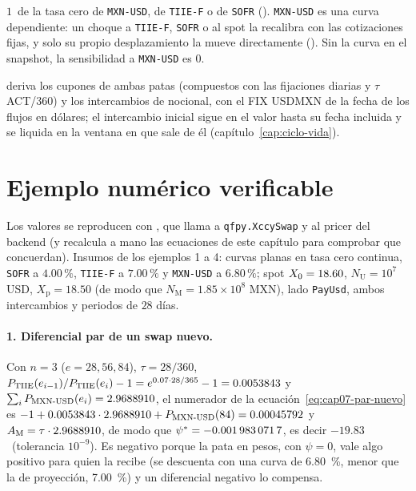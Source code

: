 \begin{description}
    $1$~\pb de la tasa cero de \texttt{MXN-USD}, de \texttt{TIIE-F} o de \texttt{SOFR}
    (). \texttt{MXN-USD} es una curva dependiente: un choque a
    \texttt{TIIE-F}, \texttt{SOFR} o al spot la recalibra con las cotizaciones fijas, y solo su propio
    desplazamiento la mueve directamente (). Sin la curva en el snapshot,
    la sensibilidad a \texttt{MXN-USD} es $0$.
  \item[Liquidaciones.]  deriva los cupones de ambas patas (compuestos con las
    fijaciones diarias y $\tau$ ACT/360) y los intercambios de nocional, con el FIX USDMXN de la fecha de los
    flujos en dólares; el intercambio inicial sigue en el valor hasta su fecha incluida y se liquida en la
    ventana en que sale de él (capítulo~\ref{cap:ciclo-vida}).
\end{description}

\section{Ejemplo numérico verificable}\label{sec:cap07-ejemplo}

Los valores se reproducen con , que llama a
\texttt{qfpy.XccySwap} y al pricer del backend (y recalcula a mano las ecuaciones de este capítulo para
comprobar que concuerdan). Insumos de los ejemplos 1 a 4: curvas planas en tasa cero continua, \texttt{SOFR} a
$4.00\,\%$, \texttt{TIIE-F} a $7.00\,\%$ y \texttt{MXN-USD} a $6.80\,\%$; spot $\Spot=18.60$,
$N_{\mathrm U}=10^{7}$ USD, $X_{\mathrm p}=18.50$ (de modo que $N_{\mathrm M}=1.85\times10^{8}$ MXN), lado
\texttt{PayUsd}, ambos intercambios y periodos de $28$ días.

\paragraph{1. Diferencial par de un swap nuevo.} Con $n=3$ ($e=28,56,84$), $\tau=28/360$,
$P_{\cTIIE}(e_{i-1})/P_{\cTIIE}(e_i)-1=e^{0.07\cdot28/365}-1=0.0053843$ y
$\sum_iP_{\cMXNcol}(e_i)=2.9688910$, el numerador de la ecuación~\eqref{eq:cap07-par-nuevo} es
$-1+0.0053843\cdot2.9688910+P_{\cMXNcol}(84)=0.00045792$ y $\Ann_{\mathrm M}=\tau\cdot2.9688910$, de modo que
$\psi^{*}=\verif{cap07-spread-par}{-0.0019830717}$, es decir $-19.83$~\pb (tolerancia $10^{-9}$). Es negativo
porque la pata en pesos, con $\psi=0$, vale algo positivo para quien la recibe (se descuenta con una curva de
6.80~\%, menor que la de proyección, 7.00~\%) y un diferencial negativo lo compensa.

